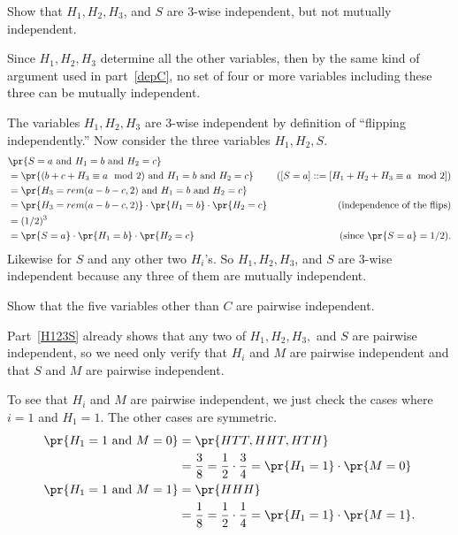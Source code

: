 \documentclass[handout]{mcs}
\begin{document}
\begin{problem}
\ppart\label{H123S} Show that $H_1,H_2,H_3$, and $S$ are 3-wise
independent, but not mutually independent.

\begin{solution}
Since $H_1,H_2,H_3$ determine all the other variables, then by
the same kind of argument used in part~\eqref{depC}, no set of four or
more variables including these three can be mutually independent.

The variables $H_1,H_2,H_3$ are 3-wise independent by definition of
``flipping independently.''  Now consider the three variables $H_1,H_2,S$.
\begin{align*}
\lefteqn{\pr{S=a \text{ and } H_1=b \text{ and } H_2=c}}\\
  & = \pr{(b+c+H_3 \equiv a \mod 2) \text{ and } H_1=b \text{ and } H_2=c}
      & ([S=a] ::= [H_1+H_2+H_3 \equiv a \mod 2])\\
  & = \pr{H_3 = rem(a-b-c,2) \text{ and } H_1=b \text{ and }
  H_2=c}\\
  & = \pr{H_3 = rem(a-b-c,2)}\cdot \pr{H_1=b} \cdot \pr{H_2=c} &
  \text{(independence of the flips)} \\
& = (1/2)^3 \\
& = \pr{S=a} \cdot \pr{H_1=b} \cdot \pr{H_2=c} &
  \text{(since $\pr{S=a}=1/2$)}.
\end{align*}
Likewise for $S$ and any other two $H_i$'s.  So $H_1,H_2,H_3$, and $S$ are
3-wise independent because any three of them are mutually independent.
\end{solution}

\iffalse
\ppart Show that the five variables other than $C$ are pairwise independent.

\begin{solution}

Part~\eqref{H123S} already shows that any two of $H_1,H_2,H_3,$ and $S$
are pairwise independent, so we need only verify that $H_i$ and $M$ are
pairwise independent and that $S$ and $M$ are pairwise independent.

To see that $H_i$ and $M$ are pairwise independent, we just check the cases where $i = 1$ and $H_1 =1$. The other cases are symmetric.
\begin{align*}
\pr{H_1=1 \text{ and } M=0} & = \pr{HTT, HHT, HTH}\\
    & = \frac{3}{8} = \frac{1}{2} \cdot \frac{3}{4} =\pr{H_1 = 1} \cdot \pr{M = 0}\\
\pr{H_1=1 \text{ and } M=1} & = \pr{HHH}\\
    & = \frac{1}{8} = \frac{1}{2} \cdot \frac{1}{4} =\pr{H_1 = 1} \cdot \pr{M = 1}.
\end{align*}


\end{solution}
\end{problem}
\end{document}
